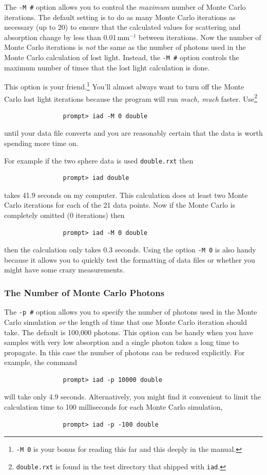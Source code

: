 \documentclass{article}
\newcommand\iadprog{\texttt{iad}}
\begin{document}
The \texttt{-M \#} option allows you to control the \textit{maximum} number of Monte
Carlo iterations.  The default setting is to do as many Monte Carlo iterations
as necessary (up to 20) to ensure that the calculated values for scattering and absorption
change by less than 0.01\,mm$^{-1}$ between iterations.  Now the number of Monte Carlo
iterations is \textit{not} the same as the number of photons used
in the Monte Carlo calculation of lost light.  Instead, the \texttt{-M \#} option
controls the maximum number of times that the lost light calculation is done.  

This option is your friend.\footnote{\texttt{-M 0} is your bonus for reading this far and
this deeply in the manual.} You'll almost always want to turn off the Monte Carlo
lost light iterations because the program will run \textit{much, much} faster.  
Use\footnote{\texttt{double.rxt} is found in the test directory that shipped with \iadprog{}.} 
\begin{verbatim}
                prompt> iad -M 0 double
\end{verbatim}
until your data file converts and you are reasonably certain that the data is 
worth spending more time on.  

For example
if the two sphere data is used \texttt{double.rxt} then
\begin{verbatim}
                prompt> iad double
\end{verbatim}
takes 41.9 seconds on my computer.  This calculation does at least two Monte
Carlo iterations for each of the 21 data points.  Now if the Monte Carlo is
completely omitted (0 iterations) then
\begin{verbatim}
                prompt> iad -M 0 double
\end{verbatim}
then the calculation only takes 0.3 seconds.  Using the option \texttt{-M 0} is also
handy because it allows you to quickly test the formatting of data files or
whether you might have some crazy measurements.

\subsubsection{The Number of Monte Carlo Photons}

The \texttt{-p \#} option allows you to specify the number of photons used
in the Monte Carlo simulation \textit{or} the length of time that one Monte
Carlo iteration should take.  The default is 100,000 photons.  
This option can be handy when you have samples with
very low absorption and a single photon takes a long time to propagate.  In
this case the number of photons can be reduced explicitly.  For example, 
the command
\begin{verbatim}
                prompt> iad -p 10000 double
\end{verbatim}
will take only 4.9 seconds.  Alternatively,
you might find it convenient to limit the calculation time to 100 milliseconds
for each Monte Carlo simulation,
\begin{verbatim}
                prompt> iad -p -100 double
\end{verbatim}
\end{document}
